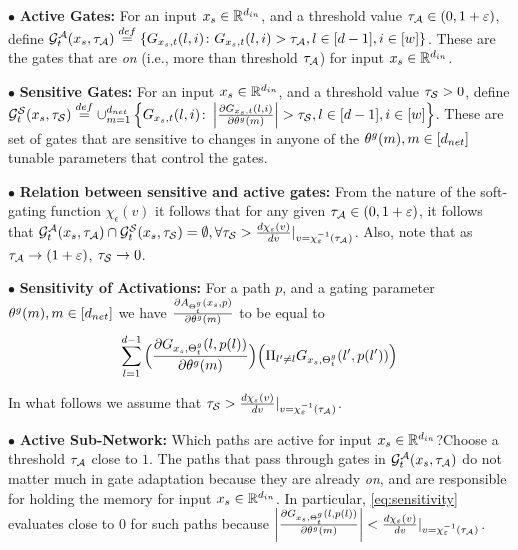 $\bullet$ \textbf{Active Gates:} For an input $x_{s}\in \R^{d_{in}}$, and a threshold value $\tau_{\A}\in (0,1+\epsilon)$, define $\G_t^{\A}(x_s,\tau_{\A})\stackrel{def}=\left\{G_{x_s,t}(l,i)\colon G_{x_s,t}(l,i)> \tau_{\A}, l\in[d-1],i\in[w]\right\}$. These are the gates that are \emph{on} (i.e., more than threshold $\tau_{\A}$) for input $x_s\in\R^{d_{in}}$.

$\bullet$ \textbf{Sensitive Gates:} For an input $x_{s}\in \R^{d_{in}}$, and a threshold value $\tau_{\S}>0$, define $\G_{t}^{\S}(x_s,\tau_{\S})\stackrel{def}=\cup_{m=1}^{d_{net}}\left\{G_{x_s,t}(l,i)\colon \left|\frac{\partial G_{x_s,t}(l,i)}{\partial \tg(m)}\right| >\tau_{\S},l\in[d-1],i\in[w] \right\}$. These are set of gates that are sensitive to changes in anyone of the $\tg(m),m\in[d_{net}]$ tunable parameters that control the gates.

$\bullet$ \textbf{Relation between sensitive and active gates:} From the nature of the soft-gating function $\chi_{\epsilon}(v)$ it follows that for any given $\tau_{\A}\in(0,1+\epsilon)$, it follows that $\G_t^{\A}(x_s,\tau_{\A})\cap \G_t^{\S}(x_s,\tau_{\S})=\emptyset,\forall \tau_{\S}>\frac{d \chi_{\epsilon}(v)}{d v}|_{v=\chi^{-1}_{\epsilon}(\tau_{\A})}$. Also, note that as $\tau_{\A}\ra (1+\epsilon)$, $\tau_{\S}\ra 0$.

$\bullet$ \textbf{Sensitivity of Activations:} For a path $p$, and a gating parameter $\tg(m),m\in[d_{net}]$ we have $\frac{\partial A_{\Tg_t}(x_s,p)}{\partial \tg(m)}$ to be equal to
\begin{align}\label{eq:sensitivity}
\sum_{l=1}^{d-1} \Big(\frac{\partial G_{x_s,\Tg_t}(l,p(l))}{\partial \tg(m)} \Big)\Big(\Pi_{l'\neq l} G_{x_s,\Tg_t}(l',p(l'))\Big)
\end{align}

In what follows we assume that $\tau_{\S}>\frac{d \chi_{\epsilon}(v)}{d v}|_{v=\chi^{-1}_{\epsilon}(\tau_{\A})}$.

$\bullet$ \textbf{Active Sub-Network:} Which paths are active for input $x_s\in\R^{d_{in}}$?\quad Choose a threshold $\tau_{\A}$ close to $1$. The paths that pass through gates in $\G_t^{\A}(x_s,\tau_{\A})$ do not matter much in gate adaptation because they are already \emph{on}, and are responsible for holding the memory for input $x_s\in\R^{d_{in}}$. In particular, \eqref{eq:sensitivity} evaluates close to $0$ for such paths because $\left|\frac{\partial G_{x_s,\Tg_t}(l,p(l))}{\partial \tg(m)}\right|<\frac{d \chi_{\epsilon}(v)}{d v}|_{v=\chi^{-1}_{\epsilon}(\tau_{\A})}$.

